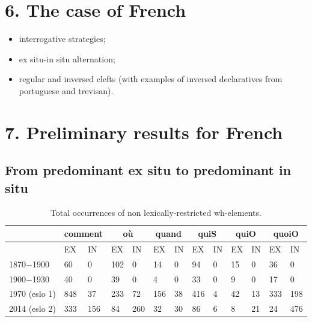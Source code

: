 \documentclass[fleqn,10pt]{wlscirep}
\begin{document}
\section*{6. The case of French}

\begin{itemize}
    \item interrogative strategies;
    \item ex situ-in situ alternation;
    \item regular and inversed clefts (with examples of inversed declaratives from portuguese and trevisan).
    \end{itemize}

\section*{7. Preliminary results for French}

\subsection*{From predominant ex situ to predominant in situ}

\begin{table}[H]
    \centering
    \small
    \begin{adjustbox}{width=\textwidth}
        \begin{tabular}{l|ll|ll|ll|ll|ll|ll}
        {} & \multicolumn{2}{c}{comment}  & \multicolumn{2}{c}{où} & \multicolumn{2}{c}{quand}& \multicolumn{2}{c}{quiS} & \multicolumn{2}{c}{quiO}& \multicolumn{2}{c}{quoiO}\\
        \hline
        {} & EX & IN & EX & IN & EX & IN & EX & IN & EX & IN & EX & IN\\
        1870$-$1900 & 60 & 0 & 102 & 0 & 14 & 0 & 94 & 0 & 15 & 0 & 36 & 0\\
        1900$-$1930 & 40 & 0 & 39 & 0 & 4 & 0 & 33 & 0 & 9 & 0 & 17 & 0\\
        1970 (eslo 1) & 848 & 37 & 233 & 72 & 156 & 38 & 416 & 4 & 42 & 13 & 333 & 198\\
        2014 (eslo 2) & 333 & 156 & 84 & 260 & 32 & 30 & 86 & 6 & 8 & 21 & 24 & 476 \\
        \hline
        \end{tabular}
    \end{adjustbox}
\caption{\label{tab:samp3}Total occurrences of non lexically-restricted wh-elements.}
\end{table}
\end{document}
